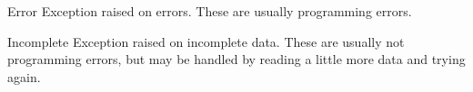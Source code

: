 \begin{excdesc}{Error}
Exception raised on errors. These are usually programming errors.
\end{excdesc}

\begin{excdesc}{Incomplete}
Exception raised on incomplete data. These are usually not programming
errors, but may be handled by reading a little more data and trying
again.
\end{excdesc}


\begin{seealso}


\end{seealso}
